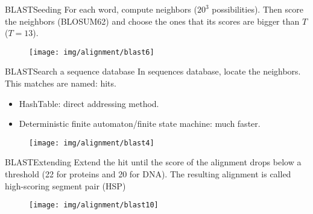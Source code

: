 \documentclass[10pt]{beamer}
\newcommand{\1}{
	\setbeamertemplate{background}{
		\texttt{[image: img/1]}
		\tikz[overlay] \fill[fill opacity=0.75,fill=white] (0,0) rectangle (-\paperwidth,\paperheight);
	}
}
\begin{document}
\begin{frame}{BLAST}{Seeding}
	For each word, compute neighbors ($20^3$ possibilities). Then score the neighbors (BLOSUM62) and choose the ones that its scores are bigger than $T$ ($T = 13$).
	\begin{figure}[]
		\centering
		\texttt{[image: img/alignment/blast6]}
	\end{figure}
\end{frame}

\begin{frame}{BLAST}{Search a sequence database}
	In sequences database, locate the neighbors. This matches are named: hits.
	\begin{itemize}
		\item HashTable: direct addressing method.
		\item Deterministic finite automaton/finite state machine: much faster.
	\end{itemize}

	\begin{figure}[]
		\centering
		\texttt{[image: img/alignment/blast4]}
	\end{figure}
\end{frame}

\begin{frame}{BLAST}{Extending}
	Extend the hit until the score of the alignment drops
	below a threshold (22 for proteins and 20 for DNA). The resulting alignment is called high-scoring segment pair (HSP)
	\begin{figure}[]
		\centering
		\texttt{[image: img/alignment/blast10]}
	\end{figure}
\end{frame}
\end{document}

